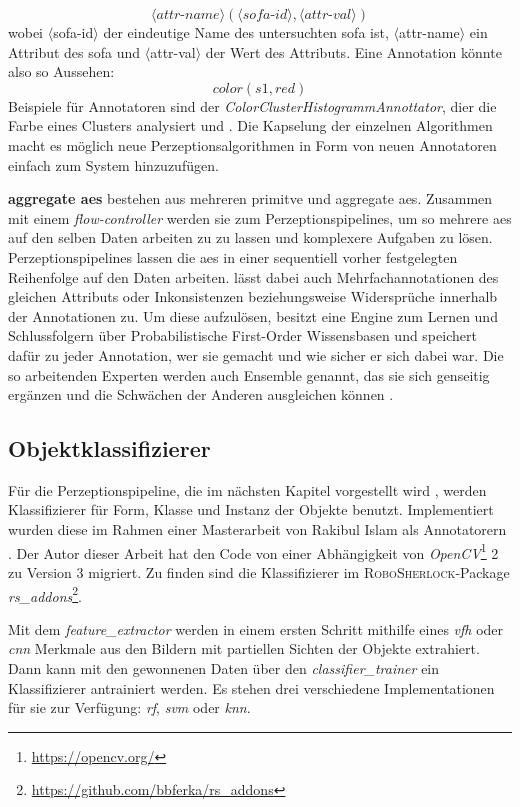 \begin{displaymath}
\langle attr\text{-}name \rangle (\langle sofa\text{-}id \rangle , \langle attr\text{-}val \rangle)
\end{displaymath}
wobei $\langle$sofa-id$\rangle$ der eindeutige Name des untersuchten \gls{sofa} ist, $\langle$attr-name$\rangle$ ein Attribut des \gls{sofa} und $\langle$attr-val$\rangle$ der Wert des Attributs. Eine Annotation könnte also so Aussehen: 
\begin{displaymath}
color(s1, red)
\end{displaymath}
Beispiele für Annotatoren sind der \textit{ColorClusterHistogrammAnnottator}, dier die Farbe eines Clusters analysiert und . Die Kapselung der einzelnen Algorithmen macht es möglich neue Perzeptionsalgorithmen in Form von neuen Annotatoren einfach zum System hinzuzufügen. \par
\textbf{aggregate \glspl{ae}} bestehen aus mehreren primitve und aggregate \glspl{ae}. Zusammen mit einem \textit{flow-controller} werden sie zum Perzeptionspipelines, um so mehrere \glspl{ae} auf den selben Daten arbeiten zu zu lassen und komplexere Aufgaben zu lösen. Perzeptionspipelines lassen die \glspl{ae} in einer sequentiell vorher festgelegten Reihenfolge auf den Daten arbeiten. \robosherlock lässt dabei auch Mehrfachannotationen des gleichen Attributs oder Inkonsistenzen beziehungsweise Widersprüche innerhalb der Annotationen zu. Um diese aufzulösen, besitzt \robosherlock eine Engine zum Lernen und Schlussfolgern über Probabilistische First-Order Wissensbasen und speichert dafür zu jeder Annotation, wer sie gemacht und wie sicher er sich dabei war. Die so arbeitenden Experten werden auch Ensemble genannt, das sie sich  genseitig ergänzen und die Schwächen der Anderen ausgleichen können \cite{polikar}.  
  
\subsection{Objektklassifizierer}
\label{sec:classifiers}
Für die Perzeptionspipeline, die im nächsten Kapitel vorgestellt wird , werden Klassifizierer für Form, Klasse und Instanz der Objekte benutzt. Implementiert wurden diese im Rahmen einer Masterarbeit von Rakibul Islam als \robosherlock Annotatorern \cite{rakib}. Der Autor dieser Arbeit hat den Code von einer Abhängigkeit von \textit{OpenCV}\footnote{\url{https://opencv.org/}} 2 zu Version 3 migriert. Zu finden sind die Klassifizierer im \textsc{RoboSherlock}-Package \textit{rs\_addons}\footnote{\url{https://github.com/bbferka/rs\_addons}}. \par
Mit dem \textit{feature\_extractor} werden in einem ersten Schritt mithilfe eines \textit{\gls{vfh}} oder \textit{\gls{cnn}} Merkmale aus den Bildern mit partiellen Sichten der Objekte extrahiert. Dann kann mit den gewonnenen Daten über den \textit{classifier\_trainer} ein Klassifizierer antrainiert werden. Es stehen drei verschiedene Implementationen für sie zur Verfügung: \textit{\gls{rf}}, \textit{\gls{svm}} oder \textit{\gls{knn}}.

